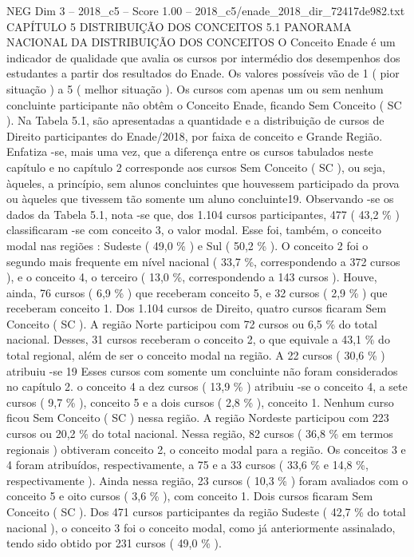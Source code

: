 \begin{textsample}{NEG Dim 3 – 2018\_c5 – Score 1.00 – 2018\_c5/enade\_2018\_dir\_72417de982.txt}  \label{ex:f3_neg_103}
CAPÍTULO 5 DISTRIBUIÇÃO DOS CONCEITOS 5.1 PANORAMA NACIONAL DA DISTRIBUIÇÃO DOS CONCEITOS O Conceito Enade é um indicador de qualidade que avalia os cursos por intermédio dos desempenhos dos estudantes a partir dos resultados do Enade.
Os valores possíveis vão de 1 ( pior situação ) a 5 ( melhor situação ).
Os cursos com apenas um ou sem nenhum concluinte participante não obtêm o Conceito Enade, ficando Sem Conceito ( SC ).
Na Tabela 5.1, são apresentadas a quantidade e a distribuição de cursos de Direito participantes do Enade/2018, por faixa de conceito e Grande Região.
Enfatiza -se, mais uma vez, que a diferença entre os cursos tabulados neste capítulo e no capítulo 2 corresponde aos cursos Sem Conceito ( SC ), ou seja, àqueles, a princípio, sem alunos concluintes que houvessem participado da prova ou àqueles que tivessem tão somente um aluno concluinte19.
Observando -se os dados da Tabela 5.1, nota -se que, dos 1.104 cursos participantes, 477 ( 43,2 \% ) classificaram -se com conceito 3, o valor modal.
Esse foi, também, o conceito modal nas regiões : Sudeste ( 49,0 \% ) e Sul ( 50,2 \% ).
O conceito 2 foi o segundo mais frequente em nível nacional ( 33,7 \%, correspondendo a 372 cursos ), e o conceito 4, o terceiro ( 13,0 \%, correspondendo a 143 cursos ).
Houve, ainda, 76 cursos ( 6,9 \% ) que receberam conceito 5, e 32 cursos ( 2,9 \% ) que receberam conceito 1.
Dos 1.104 cursos de Direito, quatro cursos ficaram Sem Conceito ( SC ).
A região Norte participou com 72 cursos ou 6,5 \% do total nacional.
Desses, 31 cursos receberam o conceito 2, o que equivale a 43,1 \% do total regional, além de ser o conceito modal na região.
A 22 cursos ( 30,6 \% ) atribuiu -se 19 Esses cursos com somente um concluinte não foram considerados no capítulo 2. o conceito 4 a dez cursos ( 13,9 \% ) atribuiu -se o conceito 4, a sete cursos ( 9,7 \% ), conceito 5 e a dois cursos ( 2,8 \% ), conceito 1.
Nenhum curso ficou Sem Conceito ( SC ) nessa região.
A região Nordeste participou com 223 cursos ou 20,2 \% do total nacional.
Nessa região, 82 cursos ( 36,8 \% em termos regionais ) obtiveram conceito 2, o conceito modal para a região.
Os conceitos 3 e 4 foram atribuídos, respectivamente, a 75 e a 33 cursos ( 33,6 \% e 14,8 \%, respectivamente ).
Ainda nessa região, 23 cursos ( 10,3 \% ) foram avaliados com o conceito 5 e oito cursos ( 3,6 \% ), com conceito 1.
Dois cursos ficaram Sem Conceito ( SC ).
Dos 471 cursos participantes da região Sudeste ( 42,7 \% do total nacional ), o conceito 3 foi o conceito modal, como já anteriormente assinalado, tendo sido obtido por 231 cursos ( 49,0 \% ).

\end{textsample}
